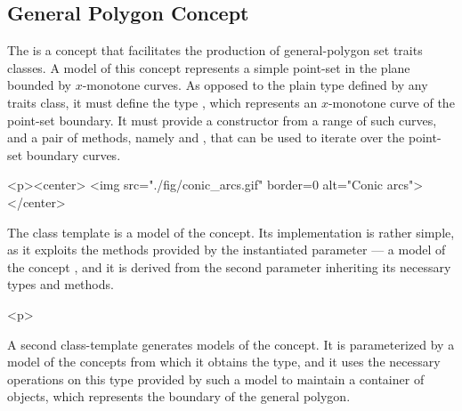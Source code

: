 \subsection{General Polygon Concept}
\label{bso_ssec:general_polygon_concept}
The  is a concept that facilitates the
production of general-polygon set traits classes. A model of this
concept represents a simple point-set in the plane bounded
by $x$-monotone curves. As opposed to the plain
 type defined by any traits class, it must
define the type , which represents an
$x$-monotone curve of the point-set boundary. It must provide a
constructor from a range of such curves, and a pair of methods, namely
 and , that can be used to
iterate over the point-set boundary curves.
 
\begin{ccHtmlOnly}
  <p><center>
    <img src="./fig/conic_arcs.gif" border=0 alt="Conic arcs">
  </center>
\end{ccHtmlOnly}
The 
class template is a model of the 
concept. Its implementation is rather simple, as it exploits the
methods provided by the instantiated parameter
 --- a model of the concept
, and it is derived from the second
parameter  inheriting its necessary types
and methods. 

\begin{ccHtmlOnly}<p>\end{ccHtmlOnly}
A second class-template
generates models of the  concept. It is
parameterized by a model of the 
concepts from which it obtains the  type, and
it uses the necessary operations on this type provided by such a model
to maintain a container of  objects, which
represents the boundary of the general polygon.

